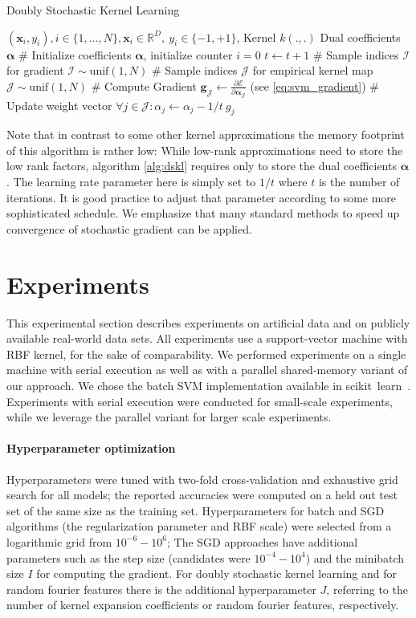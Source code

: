 \documentclass{article} %
\newcommand{\R}{\ensuremath{\mathds{R}}}
\newcommand{\va}{\boldsymbol{\alpha}}
\newcommand{\Bx}{\mathbf{x}}
\renewcommand{\vec}[1]{\mathbf{#1}}
\begin{document}
% 
\begin{algorithm}
  \begin{algorithmic}
    \caption{Doubly Stochastic Kernel Learning\label{alg:dskl}}
     \REQUIRE $(\Bx_i,y_i),i\in\{1,\dots,N\},\Bx_i\in\R^{D},~y_i\in\{-1,+1\}$, Kernel $k(.,.)$
    \ENSURE Dual coefficients $\va$ 
   \STATE \# Initialize coefficients $\va$, initialize counter $i=0$
   \STATE $t\gets t+1$
   \STATE \# Sample indices $\mathcal{I}$ for gradient 
   \STATE $\mathcal{I}\sim\text{unif}(1,N)$
   \STATE \# Sample indices $\mathcal{J}$ for empirical kernel map
   \STATE $\mathcal{J}\sim\text{unif}(1,N)$
   \STATE \# Compute Gradient
   \STATE $\vec{g}_{\mathcal{J}} \gets \frac{\partial \mathcal{E}}{\partial\va_{\mathcal{J}}}$ (see \autoref{eq:svm_gradient})
   \STATE \# Update weight vector 
   \STATE $\forall j\in\mathcal{J}: \alpha_j\gets\alpha_j - 1/t~ g_j$ 
   \ENDWHILE
  \end{algorithmic}
\end{algorithm}
%
Note that in contrast to some other kernel approximations the memory footprint of this algorithm is rather low: While low-rank approximations need to store the low rank factors, algorithm \autoref{alg:dskl} requires only to store the dual coefficients $\va$. 
The learning rate parameter here is simply set to $1/t$ where $t$ is the number of iterations. It is good practice to adjust that parameter according to some more sophisticated schedule. We emphasize that many standard methods to speed up convergence of stochastic gradient can be applied.
%
\section{Experiments}\label{sec:experiments}
This experimental section describes experiments on artificial data and on publicly available real-world data sets. All experiments use a support-vector machine with RBF kernel, for the sake of comparability. We performed experiments on a single machine with serial execution as well as with a parallel shared-memory variant of our approach. We chose the batch SVM implementation available in scikit~learn~\cite{sklearn_api}. Experiments with serial execution were conducted for small-scale experiments, while we leverage the parallel variant for larger scale experiments. 

\paragraph{Hyperparameter optimization} Hyperparameters were tuned with two-fold cross-validation and exhaustive grid search for all models; the reported accuracies were computed on a held out test set of the same size as the training set. Hyperparameters for batch and SGD algorithms (the regularization parameter and RBF scale) were selected from a logarithmic grid from $10^{-6}-10^6$; The SGD approaches have additional parameters such as the step size (candidates were $10^{-4}-10^4$) and the minibatch size $I$ for computing the gradient. For doubly stochastic kernel learning and for random fourier features there is the additional hyperparameter $J$, referring to the number of kernel expansion coefficients or random fourier features, respectively.
\end{document}
